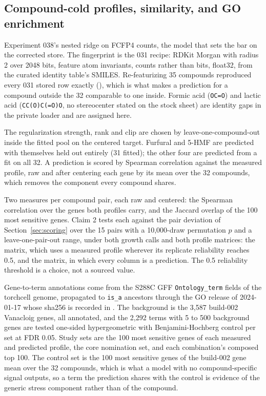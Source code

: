 \subsection{Compound-cold profiles, similarity, and GO enrichment}
\label{sec:profiles}

 Experiment 038's nested ridge on FCFP4 counts, the model that
sets the bar on the corrected store. The fingerprint is the 031 recipe: RDKit Morgan
with radius 2 over 2048 bits, feature atom invariants, counts rather than bits, float32,
from the curated identity table's SMILES. Re-featurizing 35 compounds reproduced every
031 stored row exactly
(), which is what makes a prediction for a
compound outside the 32 comparable to one inside. Formic acid (\texttt{OC=O}) and lactic
acid (\texttt{CC(O)C(=O)O}, no stereocenter stated on the stock sheet) are identity gaps
in the private loader and are assigned here.

The regularization strength, rank and clip are chosen by leave-one-compound-out inside
the fitted pool on the centered target. Furfural and 5-HMF are predicted with themselves
held out entirely (31 fitted); the other four are predicted from a fit on all 32. A
prediction is scored by Spearman correlation against the measured profile, raw and after
centering each gene by its mean over the 32 compounds, which removes the component every
compound shares.

 Two measures per compound pair, each raw and centered: the Spearman
correlation over the genes both profiles carry, and the Jaccard overlap of the 100 most
sensitive genes. Claim 2 tests each against the pair deviation of
Section~\ref{sec:scoring} over the 15 pairs with a 10,000-draw permutation $p$ and a
leave-one-pair-out range, under both growth calls and both profile matrices: the
 matrix, which uses a measured profile wherever its replicate
reliability reaches 0.5, and the  matrix, in which every column is a
prediction. The 0.5 reliability threshold is a choice, not a sourced value.

 Gene-to-term annotations come from the S288C GFF
\texttt{Ontology\_term} fields of the torchcell genome, propagated to \texttt{is\_a}
ancestors through the GO release of 2024-01-17 whose sha256 is recorded in
. The background is the 3,587 build-002 Vanacloig genes,
all annotated, and the 2,292 terms with 5 to 500 background genes are tested one-sided
hypergeometric with Benjamini-Hochberg control per set at FDR 0.05. Study sets are the
100 most sensitive genes of each measured and predicted profile, the core nomination set,
and each combination's composed top 100. The control set is the 100 most sensitive genes
of the build-002 gene mean over the 32 compounds, which is what a model with no
compound-specific signal outputs, so a term the prediction shares with the control is
evidence of the generic stress component rather than of the compound.
